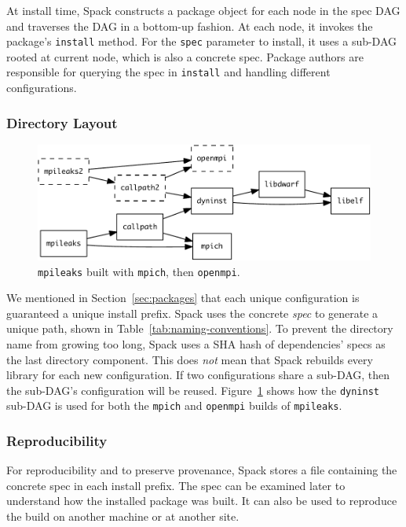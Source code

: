 At install time, Spack constructs a package object for each node in the spec DAG
and traverses the DAG in a bottom-up fashion.  At each node, it invokes the package's
{\tt install} method.  For the {\tt spec} parameter to install, it uses a sub-DAG
rooted at current node, which is also a concrete spec.  Package authors are
responsible for querying the spec in {\tt install} and handling different configurations.

\subsubsection{Directory Layout}\label{sec:directory-layout}
\begin{figure}\centering
   \includegraphics[width=\linewidth]{specs/rpaths.pdf}
   \caption{
       {\tt mpileaks} built with {\tt mpich}, then {\tt openmpi}.
       \label{fig:reuse}
   }
\end{figure}

We mentioned in Section~\ref{sec:packages} that each unique configuration is
guaranteed a unique install prefix. Spack uses the concrete {\it spec} 
to generate a unique path, shown in Table~\ref{tab:naming-conventions}.
To prevent the directory name from growing too long, Spack uses a SHA hash of
dependencies' specs as the last directory component.  This
does {\it not} mean that Spack rebuilds every library for each new configuration.
If two configurations share a sub-DAG, then the sub-DAG's configuration will
be reused.  Figure~\ref{fig:reuse} shows how the {\tt dyninst} sub-DAG is used for
both the {\tt mpich} and {\tt openmpi} builds of {\tt mpileaks}.


\subsubsection{Reproducibility}
For reproducibility and to preserve provenance, Spack stores a file containing
the concrete spec in each
install prefix. The spec can be examined later to understand how the installed
package was built.  It can also be used to reproduce the build on another machine
or at another site.

